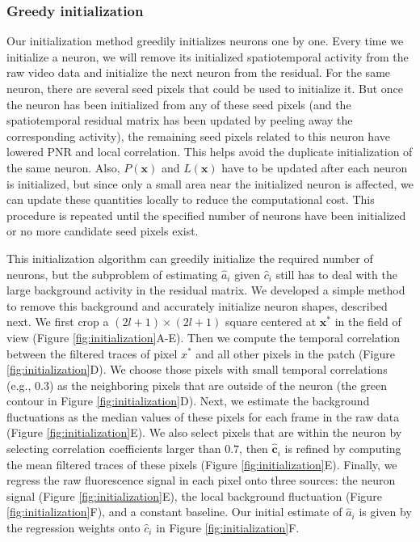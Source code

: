 \documentclass[9pt,lineno]{elife}
\begin{document}
\subsubsection{Greedy initialization}
Our initialization method greedily initializes neurons one by one. Every time we initialize a neuron, we will remove its initialized spatiotemporal activity from the raw video data and initialize the next neuron from the residual. For the same neuron, there are several seed pixels that could be used to initialize it. But once the neuron has been initialized from any of these seed pixels (and the spatiotemporal residual matrix has been updated by peeling away the corresponding activity), the remaining seed pixels related to this neuron have lowered PNR and local correlation. This helps avoid the duplicate initialization of the same neuron. Also, $P(\bm{x})$ and $L(\bm{x})$ have to be updated after each neuron is initialized, but since only a small area near the initialized neuron is affected, we can update these quantities locally to reduce the computational cost.  This procedure is repeated until the specified number of neurons have been initialized or no more candidate seed pixels exist. 

This initialization algorithm can greedily initialize the required number of neurons, but the subproblem of estimating $\hat{a}_i$ given $\hat{c}_i$ still has to deal with the large background activity in the residual matrix. We developed a simple method to remove this background and accurately initialize neuron shapes, described next.
We first crop a $(2l+1) \times (2l+1)$ square centered at $\bm{x}^*$ in the field of view (Figure \ref{fig:initialization}A-E). Then we compute the temporal correlation between the filtered traces of  pixel $x^*$ and all other pixels in the patch (Figure \ref{fig:initialization}D). We choose those pixels with small temporal correlations (e.g., 0.3) as the neighboring pixels that are outside of the neuron (the green contour in Figure \ref{fig:initialization}D). Next, we estimate the background fluctuations as the median values of these pixels for each frame in the raw data (Figure \ref{fig:initialization}E). We also select pixels that are within the neuron by selecting correlation coefficients larger than $0.7$, then $\hat{\bm{c}}_i$ is refined by computing the mean filtered traces of these pixels (Figure \ref{fig:initialization}E). Finally, we regress the raw fluorescence signal in each pixel onto three sources: the neuron signal (Figure \ref{fig:initialization}E), the local background fluctuation  (Figure \ref{fig:initialization}F), and a constant baseline. Our initial estimate of $\hat{a}_i$ is given by the regression weights onto $\hat{c}_i$ in Figure \ref{fig:initialization}F. 
\end{document}
